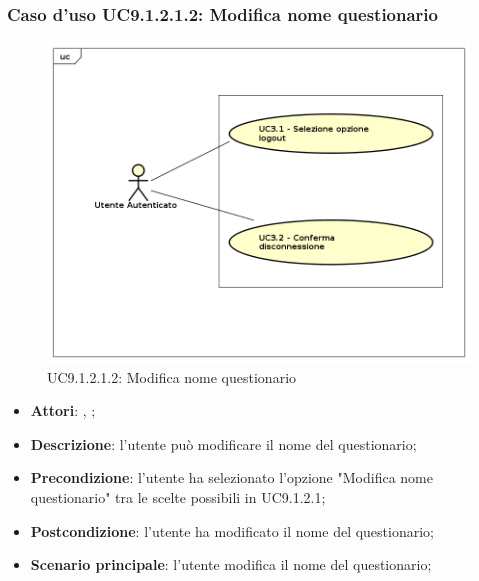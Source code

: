 					\subsubsection{Caso d'uso UC9.1.2.1.2: Modifica nome questionario}
					\label{UC9.1.2.1.2}
					\begin{figure}[h]
						\centering
					\includegraphics[scale=0.7,keepaspectratio]{UML/UC9.png}
						\caption{UC9.1.2.1.2: Modifica nome questionario}
					\end{figure}
					\FloatBarrier
					\begin{itemize}
						\item \textbf{Attori}: \uau, \uaupro;
						\item \textbf{Descrizione}: l'utente può modificare il nome del questionario; 
						\item \textbf{Precondizione}: l'utente ha selezionato l'opzione "Modifica nome questionario" tra le scelte possibili in UC9.1.2.1;
						\item \textbf{Postcondizione}: l'utente ha modificato il nome del questionario; 
						\item \textbf{Scenario principale}: l'utente modifica il nome del questionario;
					\end{itemize}
					
